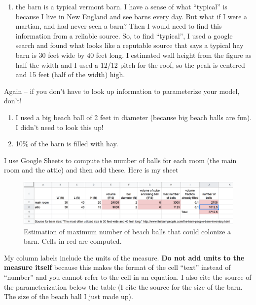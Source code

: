 \documentclass[]{book}
\providecommand{\tightlist}{%
  \setlength{\itemsep}{0pt}\setlength{\parskip}{0pt}}
\begin{document}
\begin{enumerate}
\def\labelenumi{\arabic{enumi}.}
\tightlist
\item
  the barn is a typical vermont barn. I have a sense of what ``typical''
  is because I live in New England and see barns every day. But what if
  I were a martian, and had never seen a barn? Then I would need to find
  this information from a reliable source. So, to find ``typical'', I
  used a google search and found what looks like a reputable source that
  says a typical hay barn is 30 feet wide by 40 feet long. I estimated
  wall height from the figure as half the width and I used a 12/12 pitch
  for the roof, so the peak is centered and 15 feet (half of the width)
  high.
\end{enumerate}

Again -- if you don't have to look up information to parameterize your
model, don't!

\begin{enumerate}
\def\labelenumi{\arabic{enumi}.}
\setcounter{enumi}{1}
\item
  I used a big beach ball of 2 feet in diameter (because big beach balls
  are fun). I didn't need to look this up!
\item
  10\% of the barn is filled with hay.
\end{enumerate}

I use Google Sheets to compute the number of balls for each room (the
main room and the attic) and then add these. Here is my sheet

\begin{figure}

{\centering \includegraphics[width=0.8\linewidth]{images/balls} 

}

\caption{Estimation of maximum number of beach balls that could colonize a barn. Cells in red are computed.}\label{fig:balls}
\end{figure}

My column labels include the units of the measure. \textbf{Do not add
units to the measure itself} because this makes the format of the cell
``text'' instead of ``number'' and you cannot refer to the cell in an
equation. I also cite the source of the parameterization below the table
(I cite the source for the size of the barn. The size of the beach ball
I just made up).
\end{document}
